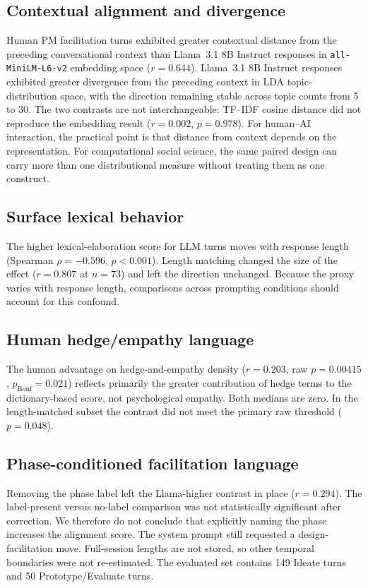 \documentclass[11pt]{article}
\begin{document}
\subsection{Contextual alignment and divergence}
Human PM facilitation turns exhibited greater contextual distance from the preceding conversational context than Llama~3.1 8B Instruct responses in \texttt{all-MiniLM-L6-v2} embedding space ($r = 0.644$). Llama~3.1 8B Instruct responses exhibited greater divergence from the preceding context in LDA topic-distribution space, with the direction remaining stable across topic counts from 5 to 30. The two contrasts are not interchangeable: TF--IDF cosine distance did not reproduce the embedding result ($r = 0.002$, $p = 0.978$). For human--AI interaction, the practical point is that distance from context depends on the representation. For computational social science, the same paired design can carry more than one distributional measure without treating them as one construct.

\subsection{Surface lexical behavior}
The higher lexical-elaboration score for LLM turns moves with response length (Spearman $\rho = -0.596$, $p < 0.001$). Length matching changed the size of the effect ($r = 0.807$ at $n = 73$) and left the direction unchanged. Because the proxy varies with response length, comparisons across prompting conditions should account for this confound.

\subsection{Human hedge/empathy language}
The human advantage on hedge-and-empathy density ($r = 0.203$, raw $p = 0.00415$, $p_\text{Bonf} = 0.021$) reflects primarily the greater contribution of hedge terms to the dictionary-based score, not psychological empathy. Both medians are zero. In the length-matched subset the contrast did not meet the primary raw threshold ($p = 0.048$).

\subsection{Phase-conditioned facilitation language}
Removing the phase label left the Llama-higher contrast in place ($r = 0.294$). The label-present versus no-label comparison was not statistically significant after correction. We therefore do not conclude that explicitly naming the phase increases the alignment score. The system prompt still requested a design-facilitation move. Full-session lengths are not stored, so other temporal boundaries were not re-estimated. The evaluated set contains 149 Ideate turns and 50 Prototype/Evaluate turns.
\end{document}
